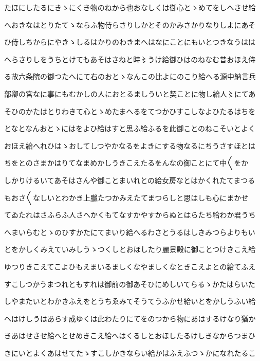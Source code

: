 \documentclass[a4paper,11pt,landscape]{ltjtarticle}
\begin{document}
\par\medskip
たほにしたるにきゝにくき物のねから也おなしくは御心とゝめてをしへさせ給
\par\medskip
へおきなはとりたてゝならふ物侍らさりしかとそのかみさかりなりしよにあそ
\par\medskip
ひ侍しちからにやきゝしるはかりのわきまへはなにことにもいとつきなうはは
\par\medskip
へらさりしをうちとけてもあそはさねと時〻うけ給御ひはのねなむ昔おほえ侍
\par\medskip
る故六条院の御つたへにて右のおとゝなんこの比よにのこり給へる源中納言兵
\par\medskip
部卿の宮なに事にもむかしの人におとるましういと契ことに物し給人〻にてあ
\par\medskip
そひのかたはとりわきて心とゝめたまへるをてつかひすこしなよひたるはちを
\par\medskip
となとなんおとゝにはをよひ給はすと思ふ給ふるを此御ことのねこそいとよく
\par\medskip
おほえ給へれひはゝおしてしつやかなるをよきにする物なるにちうさすほとは
\par\medskip
ちをとのさまかはりてなまめかしうきこえたるをんなの御ことにて中〱をか
\par\medskip
しかりけるいてあそはさんや御ことまいれとの給女房なとはかくれたてまつる
\par\medskip
もおさ〱なしいとわかき上臘たつかみえたてまつらしと思はしも心にまかせ
\par\medskip
てゐたれはさふらふ人さへかくもてなすかやすからぬとはらたち給わか君うち
\par\medskip
へまいらむとゝのひすかたにてまいり給へるわさとうるはしきみつらよりもい
\par\medskip
とをかしくみえていみしうゝつくしとおほしたり麗景殿に御ことつけきこえ給
\par\medskip
ゆつりきこえてこよひもえまいるましくなやましくなときこえよとの給てふえ
\par\medskip
すこしつかうまつれともすれは御前の御あそひにめしいてらるゝかたはらいた
\par\medskip
しやまたいとわかきふえをとうちゑみてそうてうふかせ給いとをかしうふい給
\par\medskip
へはけしうはあらす成ゆくは此わたりにてをのつから物にあはするけなり猶か
\par\medskip
きあはせさせ給へとせめきこえ給へはくるしとおほしたるけしきなからつまひ
\par\medskip
きにいとよくあはせてたゝすこしかきならい給かはふえふつゝかになれたるこ
\end{document}
